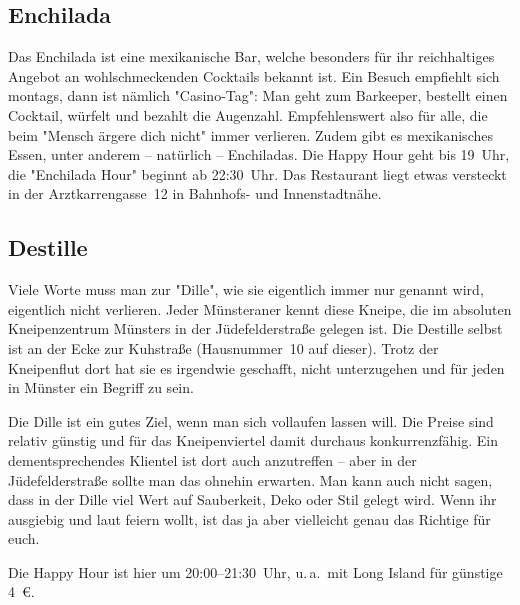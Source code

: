 {\begin{multicols*}{2}
\subsection{Enchilada}
Das Enchilada ist eine mexikanische Bar, welche besonders für ihr reichhaltiges Angebot an wohlschmeckenden Cocktails bekannt ist.
Ein Besuch empfiehlt sich montags, dann ist nämlich "Casino-Tag":
Man geht zum Barkeeper, bestellt einen Cocktail, würfelt und bezahlt die Augenzahl.
Empfehlenswert also für alle, die beim "Mensch ärgere dich nicht" immer verlieren.
Zudem gibt es mexikanisches Essen, unter anderem -- natürlich -- Enchiladas.
Die Happy Hour geht bis 19~Uhr, die "Enchilada Hour" beginnt ab 22:30~Uhr.
Das Restaurant liegt etwas versteckt in der Arztkarrengasse~12 in Bahnhofs- und Innenstadtnähe.

\begin{center}
\end{center}

\subsection{Destille}
Viele Worte muss man zur "Dille", wie sie eigentlich immer nur genannt wird, eigentlich nicht verlieren.
Jeder Münsteraner kennt diese Kneipe, die im absoluten Kneipenzentrum Münsters in der Jüdefelderstraße gelegen ist.
Die Destille selbst ist an der Ecke zur Kuhstraße (Hausnummer~10 auf dieser).
Trotz der Kneipenflut dort hat sie es irgendwie geschafft, nicht unterzugehen und für jeden in Münster ein Begriff zu sein.

Die Dille ist ein gutes Ziel, wenn man sich vollaufen lassen will.
Die Preise sind relativ günstig und für das Kneipenviertel damit durchaus konkurrenzfähig.
Ein dementsprechendes Klientel ist dort auch anzutreffen -- aber in der Jüdefelderstraße sollte man das ohnehin erwarten.
Man kann auch nicht sagen, dass in der Dille viel Wert auf Sauberkeit, Deko oder Stil gelegt wird.
Wenn ihr ausgiebig und laut feiern wollt, ist das ja aber vielleicht genau das Richtige für euch.

Die Happy Hour ist hier um 20:00--21:30~Uhr, u.\,a.\ mit Long Island für günstige \SI{4}{\euro}.

\begin{center}
\end{center}


\end{multicols*}}
